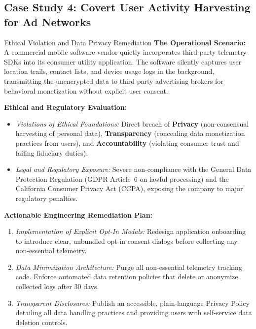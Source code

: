 \documentclass[11pt,a4paper]{article}
\begin{document}
\subsection{Case Study 4: Covert User Activity Harvesting for Ad Networks}
\begin{casestudybox}{Ethical Violation and Data Privacy Remediation}
\textbf{The Operational Scenario:} A commercial mobile software vendor quietly incorporates third-party telemetry SDKs into its consumer utility application. The software silently captures user location trails, contact lists, and device usage logs in the background, transmitting the unencrypted data to third-party advertising brokers for behavioral monetization without explicit user consent.

\textbf{Ethical and Regulatory Evaluation:}
\begin{itemize}
    \item \textit{Violations of Ethical Foundations:} Direct breach of \textbf{Privacy} (non-consensual harvesting of personal data), \textbf{Transparency} (concealing data monetization practices from users), and \textbf{Accountability} (violating consumer trust and failing fiduciary duties).
    \item \textit{Legal and Regulatory Exposure:} Severe non-compliance with the General Data Protection Regulation (GDPR Article~6 on lawful processing) and the California Consumer Privacy Act (CCPA), exposing the company to major regulatory penalties.
\end{itemize}

\textbf{Actionable Engineering Remediation Plan:}
\begin{enumerate}
    \item \textit{Implementation of Explicit Opt-In Modals:} Redesign application onboarding to introduce clear, unbundled opt-in consent dialogs before collecting any non-essential telemetry.
    \item \textit{Data Minimization Architecture:} Purge all non-essential telemetry tracking code. Enforce automated data retention policies that delete or anonymize collected logs after 30 days.
    \item \textit{Transparent Disclosures:} Publish an accessible, plain-language Privacy Policy detailing all data handling practices and providing users with self-service data deletion controls.
\end{enumerate}
\end{casestudybox}

\end{document}
